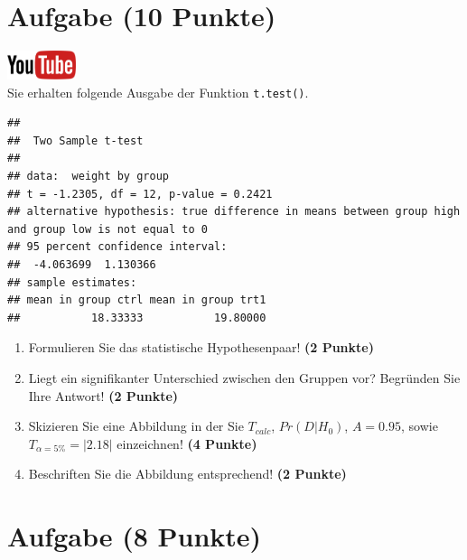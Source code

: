 \documentclass[a4paper, 10pt]{scrartcl}\usepackage[]{graphicx}\usepackage[]{xcolor}
\makeatletter
\newenvironment{kframe}{%
 \def\at@end@of@kframe{}%
 \ifinner\ifhmode%
  \def\at@end@of@kframe{\end{minipage}}%
  \begin{minipage}{\columnwidth}%
 \fi\fi%
 \def\FrameCommand##1{\hskip\@totalleftmargin \hskip-\fboxsep
 \colorbox{shadecolor}{##1}\hskip-\fboxsep
     \hskip-\linewidth \hskip-\@totalleftmargin \hskip\columnwidth}%
 \MakeFramed {\advance\hsize-\width
   \@totalleftmargin\z@ \linewidth\hsize
   \@setminipage}}%
 {\par\unskip\endMakeFramed%
 \at@end@of@kframe}
\newenvironment{knitrout}{}{} %
\makeatother
\begin{document}
\section{Aufgabe \hfill (10 Punkte)}

\hfill\href{https://youtu.be/exDo7AyHl4Q}{\includegraphics[width =
  2cm]{img/youtube}}\\[1Ex]

Sie erhalten folgende \Rlogo Ausgabe der Funktion \texttt{t.test()}.

\begin{knitrout}
\color{fgcolor}\begin{kframe}
\begin{verbatim}
## 
## 	Two Sample t-test
## 
## data:  weight by group
## t = -1.2305, df = 12, p-value = 0.2421
## alternative hypothesis: true difference in means between group high and group low is not equal to 0
## 95 percent confidence interval:
##  -4.063699  1.130366
## sample estimates:
## mean in group ctrl mean in group trt1 
##           18.33333           19.80000
\end{verbatim}
\end{kframe}
\end{knitrout}


\begin{enumerate}
  \item Formulieren Sie das statistische Hypothesenpaar! \textbf{(2
Punkte)}
\item Liegt ein signifikanter Unterschied zwischen den Gruppen vor?
  Begr{\"u}nden Sie Ihre Antwort! \textbf{(2 Punkte)}
\item Skizieren Sie eine Abbildung in der Sie $T_{calc}$, $Pr(D|H_0)$, $A=0.95$,
  sowie $T_{\alpha=5\%} = |2.18|$ einzeichnen! \textbf{(4 Punkte)}
\item Beschriften Sie die Abbildung entsprechend! \textbf{(2 Punkte)}  
\end{enumerate} 
\clearpage

\section{Aufgabe \hfill (8 Punkte)}
\end{document}
